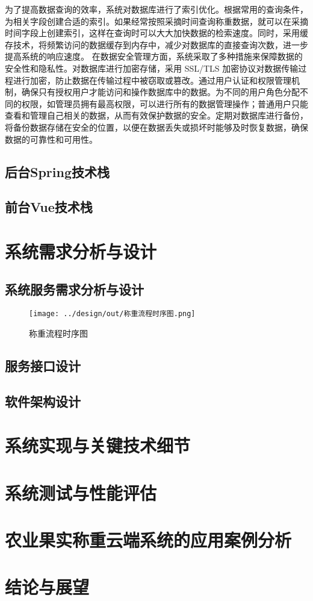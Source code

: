 \documentclass{xduugthesis}
\begin{document}
为了提高数据查询的效率，系统对数据库进行了索引优化。根据常用的查询条件，为相关字段创建合适的索引。如果经常按照采摘时间查询称重数据，就可以在采摘时间字段上创建索引，这样在查询时可以大大加快数据的检索速度。同时，采用缓存技术，将频繁访问的数据缓存到内存中，减少对数据库的直接查询次数，进一步提高系统的响应速度。
在数据安全管理方面，系统采取了多种措施来保障数据的安全性和隐私性。对数据库进行加密存储，采用 SSL/TLS 加密协议对数据传输过程进行加密，防止数据在传输过程中被窃取或篡改。通过用户认证和权限管理机制，确保只有授权用户才能访问和操作数据库中的数据。为不同的用户角色分配不同的权限，如管理员拥有最高权限，可以进行所有的数据管理操作；普通用户只能查看和管理自己相关的数据，从而有效保护数据的安全。定期对数据库进行备份，将备份数据存储在安全的位置，以便在数据丢失或损坏时能够及时恢复数据，确保数据的可靠性和可用性。

\section{后台Spring技术栈}

\section{前台Vue技术栈}

\chapter{系统需求分析与设计}

\section{系统服务需求分析与设计}

\begin{figure}[htb]
    \centering
    \texttt{[image: ../design/out/称重流程时序图.png]}
    \caption{称重流程时序图}
    \label{fig:称重流程时序图}
\end{figure}

\section{服务接口设计}

\section{软件架构设计}



\chapter{系统实现与关键技术细节}
\chapter{系统测试与性能评估}
\chapter{农业果实称重云端系统的应用案例分析}
\chapter{结论与展望}
\end{document}
